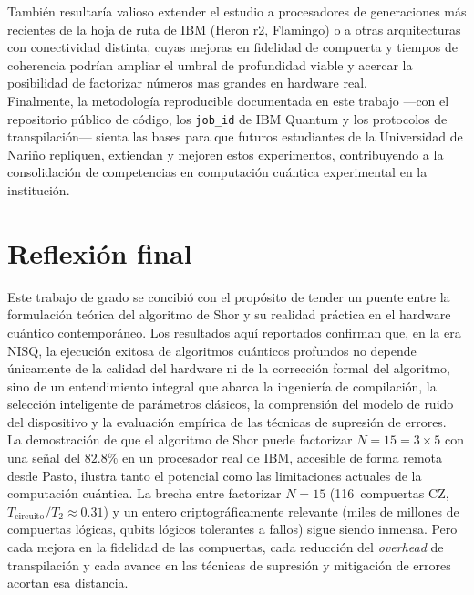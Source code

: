 \documentclass[12pt, spanish]{book}
\begin{document}
También resultaría valioso extender el estudio a procesadores de generaciones más recientes de la hoja de ruta de IBM (Heron r2, Flamingo) o a otras arquitecturas con conectividad distinta, cuyas mejoras en fidelidad de compuerta y tiempos de coherencia podrían ampliar el umbral de profundidad viable y acercar la posibilidad de factorizar números mas grandes en hardware real.\\

Finalmente, la metodología reproducible documentada en este trabajo ---con el repositorio público de código, los \texttt{job\_id} de IBM Quantum y los protocolos de transpilación--- sienta las bases para que futuros estudiantes de la Universidad de Nariño repliquen, extiendan y mejoren estos experimentos, contribuyendo a la consolidación de competencias en computación cuántica experimental en la institución.

\section{Reflexión final}

Este trabajo de grado se concibió con el propósito de tender un puente entre la formulación teórica del algoritmo de Shor y su realidad práctica en el hardware cuántico contemporáneo. Los resultados aquí reportados confirman que, en la era NISQ, la ejecución exitosa de algoritmos cuánticos profundos no depende únicamente de la calidad del hardware ni de la corrección formal del algoritmo, sino de un entendimiento integral que abarca la ingeniería de compilación, la selección inteligente de parámetros clásicos, la comprensión del modelo de ruido del dispositivo y la evaluación empírica de las técnicas de supresión de errores.\\

La demostración de que el algoritmo de Shor puede factorizar $N = 15 = 3 \times 5$ con una señal del $82.8\%$ en un procesador real de IBM, accesible de forma remota desde Pasto, ilustra tanto el potencial como las limitaciones actuales de la computación cuántica. La brecha entre factorizar $N = 15$ (116~compuertas CZ, $T_{\text{circuito}}/T_2 \approx 0.31$) y un entero criptográficamente relevante (miles de millones de compuertas lógicas, qubits lógicos tolerantes a fallos) sigue siendo inmensa. Pero cada mejora en la fidelidad de las compuertas, cada reducción del \textit{overhead} de transpilación y cada avance en las técnicas de supresión y mitigación de errores acortan esa distancia.\\
\end{document}
